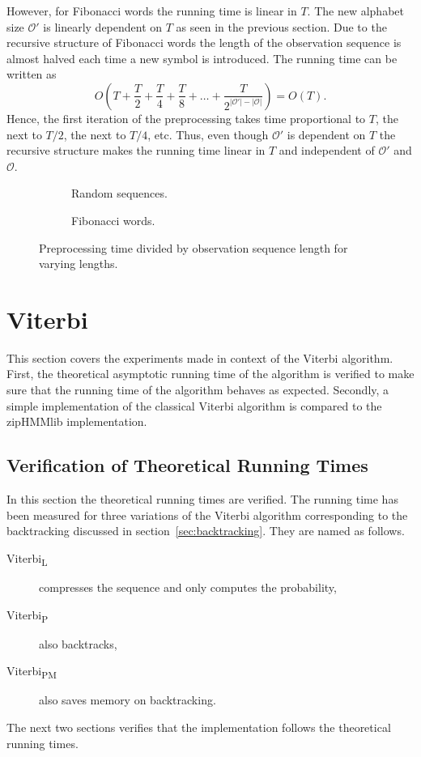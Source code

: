 However, for Fibonacci words the running time is linear in $T$. The new
alphabet size $\mathcal{O'}$ is linearly dependent on $T$ as seen in the
previous section. Due to the recursive structure of Fibonacci words the length
of the observation sequence is almost halved each time a new symbol is
introduced. The running time can be written as
\begin{equation*}
  O(T + \frac{T}{2} + \frac{T}{4} + \frac{T}{8} + \dots + \frac{T}{2^{\lvert\mathcal{O'}\rvert - \lvert{\mathcal{O}}\rvert}}) = O(T).
\end{equation*}
Hence, the first iteration of the preprocessing takes time proportional to $T$,
the next to $T/2$, the next to $T/4$, etc. Thus, even though $\mathcal{O'}$
is dependent on $T$ the recursive structure makes the running time linear in
$T$ and independent of $\mathcal{O'}$ and $\mathcal{O}$.

\begin{figure}
  \centering
  \begin{subfigure}[b]{0.5\textwidth}
    \centering 
    \caption{Random sequences.}
  \end{subfigure}%
  \begin{subfigure}[b]{0.5\textwidth}
    \centering 
    \caption{Fibonacci words.}
  \end{subfigure}
  \caption{Preprocessing time divided by observation sequence length for
    varying lengths.}
  \label{fig:pre_viterbi_T}
\end{figure}

\section{Viterbi}

This section covers the experiments made in context of the Viterbi algorithm.
First, the theoretical asymptotic running time of the algorithm is verified to
make sure that the running time of the algorithm behaves as expected. Secondly,
a simple implementation of the classical Viterbi algorithm is compared to the
zipHMMlib implementation.

\subsection{Verification of Theoretical Running Times}
\label{sec:theor-runn-times}

In this section the theoretical running times are verified. The running time
has been measured for three variations of the Viterbi algorithm corresponding
to the backtracking discussed in section~\ref{sec:backtracking}. They are named
as follows.
\begin{description}
\item[Viterbi\textsubscript{L}] compresses the sequence and only computes the
  probability,
\item[Viterbi\textsubscript{P}] also backtracks,
\item[Viterbi\textsubscript{PM}] also saves memory on backtracking.
\end{description}
The next two sections verifies that the implementation follows the theoretical
running times.

